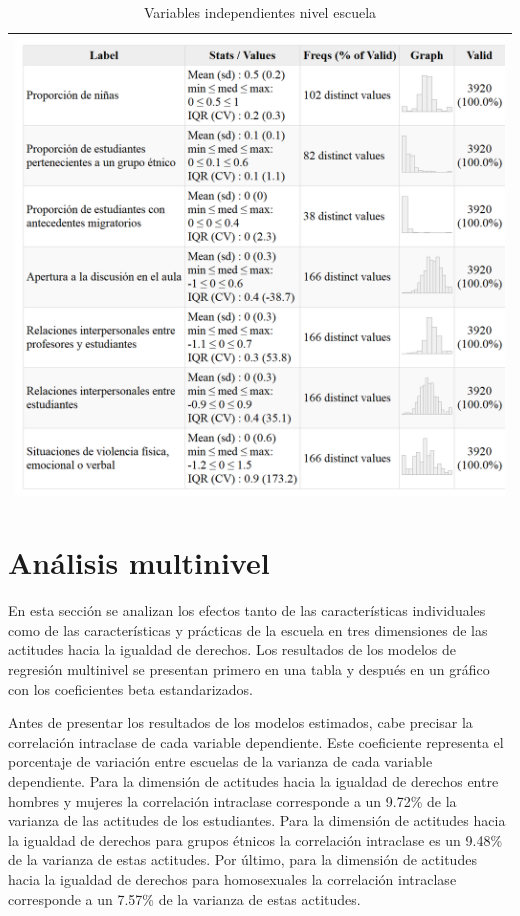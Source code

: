 \documentclass[12pt,twoside]{templates/facsothesis}
\begin{document}
\begin{longtable}[]{@{}l@{}}
\caption{\label{tab:unnamed-chunk-8}Variables independientes nivel escuela}\tabularnewline
\toprule
\endhead
\includegraphics[width=\textwidth,height=0.5\textheight]{input/images/desc01_indep_col.png} \\
\bottomrule
\end{longtable}

\hypertarget{anuxe1lisis-multinivel}{%
\section{Análisis multinivel}\label{anuxe1lisis-multinivel}}

En esta sección se analizan los efectos tanto de las características individuales como de las características y prácticas de la escuela en tres dimensiones de las actitudes hacia la igualdad de derechos. Los resultados de los modelos de regresión multinivel se presentan primero en una tabla y después en un gráfico con los coeficientes beta estandarizados.

Antes de presentar los resultados de los modelos estimados, cabe precisar la correlación intraclase de cada variable dependiente. Este coeficiente representa el porcentaje de variación entre escuelas de la varianza de cada variable dependiente. Para la dimensión de actitudes hacia la igualdad de derechos entre hombres y mujeres la correlación intraclase corresponde a un 9.72\% de la varianza de las actitudes de los estudiantes. Para la dimensión de actitudes hacia la igualdad de derechos para grupos étnicos la correlación intraclase es un 9.48\% de la varianza de estas actitudes. Por último, para la dimensión de actitudes hacia la igualdad de derechos para homosexuales la correlación intraclase corresponde a un 7.57\% de la varianza de estas actitudes.
\end{document}
